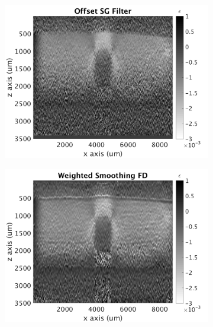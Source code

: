 \begin{figure}[b!]
\begin{subfigure}{0.49\textwidth}
        \includegraphics[width=\textwidth]{figures/posg_fr70_lr0.png}
	\end{subfigure}
    \begin{subfigure}{0.49\textwidth}
    	\centering
        \includegraphics[width=\textwidth]{figures/wfd_fr70_lr0.png}
    \end{subfigure}
    \\
    \begin{subfigure}{0.49\textwidth}
    	\centering

\end{subfigure}
\end{figure}
